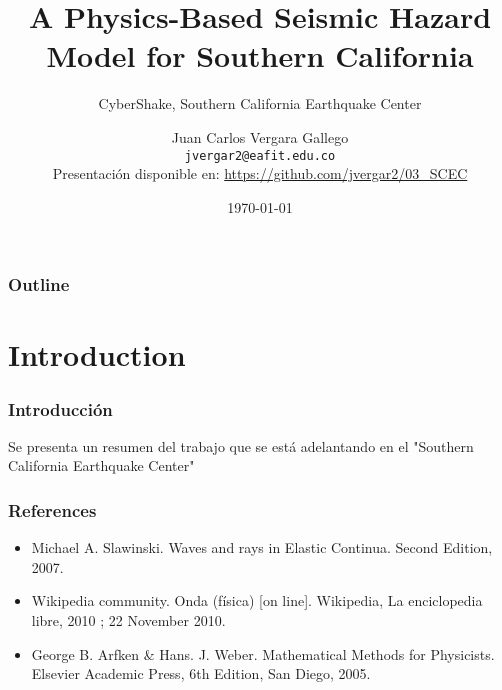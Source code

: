 \documentclass{beamer}
\begin{document}
\title[CyberShake] %
{A Physics-Based Seismic Hazard Model for Southern California}
\subtitle{CyberShake, Southern California Earthquake Center}
\author[Vergara Gallego, Juan Carlos] %
{Juan Carlos Vergara Gallego\\ \texttt{\small jvergar2@eafit.edu.co}\\
{\tiny Presentación disponible en: \url{https://github.com/jvergar2/03_SCEC}}}
\date{\today}
\subject{Ingeniería Sísmica}

\frame{\titlepage}

\begin{frame}
	\frametitle{Outline}
	\tableofcontents
\end{frame}
%


\section{Introduction}
\begin{frame}
\frametitle{Introducción}
%
Se presenta un resumen del trabajo que se está adelantando en el "Southern California Earthquake Center"
%
\end{frame}
%
%
\begin{frame}\frametitle{References}
\begin{itemize}
\item Michael A. Slawinski. Waves and rays in Elastic Continua. Second Edition, 2007.
 
\item Wikipedia community. Onda (f\'isica) [on line]. Wikipedia, La enciclopedia libre, 2010 ; 22 November 2010. 

\item George B. Arfken \& Hans. J. Weber. Mathematical Methods for Physicists. Elsevier Academic Press, 6th Edition, San Diego, 2005.
\end{itemize}
\end{frame}
\end{document}
